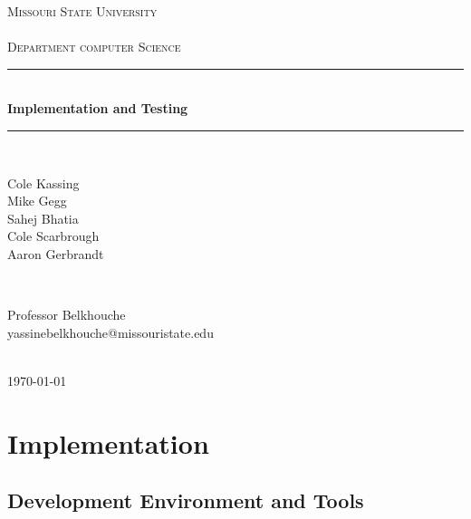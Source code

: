 \documentclass[12pt]{article}
\begin{document}
\begin{titlepage}

\newcommand{\HRule}{\rule{\linewidth}{0.5mm}} 

\center 

\textsc{\LARGE Missouri State University\\~\\Department computer Science}\\[1.0cm] 

\HRule \\[0.4cm]
{ \huge \bfseries Implementation and Testing}\\[0.4cm] 
\HRule \\[1.5cm]


\begin{minipage}{0.4\textwidth}
\begin{flushleft} \large
Cole Kassing \\ 
Mike Gegg \\ 
Sahej Bhatia \\ 
Cole Scarbrough \\ 
Aaron Gerbrandt\\ 
\end{flushleft}
\end{minipage}
~
\begin{minipage}{0.4\textwidth}
\begin{flushright} \large
Professor Belkhouche \\ 
yassinebelkhouche@missouristate.edu
\end{flushright}
\end{minipage}\\[2cm]


{\large \today}\\[2cm] 

\end{titlepage}

\newpage
\section{Implementation}


\subsection{Development Environment and Tools}
\end{document}
